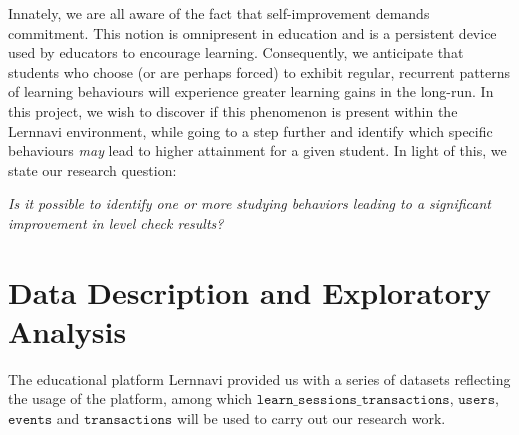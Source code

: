 \documentclass[sigplan,screen]{acmart}
\begin{document}
Innately, we are all aware of the fact that self-improvement demands commitment. This notion is omnipresent in education and is a persistent device used by educators to encourage learning. Consequently, we anticipate that students who choose (or are perhaps forced) to exhibit regular, recurrent patterns of learning behaviours will experience greater learning gains in the long-run. In this project, we wish to discover if this phenomenon is present within the Lernnavi environment, while going to a step further and identify which specific behaviours \textit{may} lead to higher attainment for a given student. In light of this, we state our research question:

\begin{displayquote}
\textit{Is it possible to identify one or more studying behaviors leading to a significant improvement in level check results?}
\end{displayquote}



\section{Data Description and Exploratory Analysis}\label{sec:data}


The educational platform Lernnavi provided us with a series of datasets reflecting the usage of the platform, among which $\texttt{learn\_sessions\_transactions}$, $\texttt{users}$, $\texttt{events}$ and $\texttt{transactions}$ will be used to carry out our research work.
\end{document}
